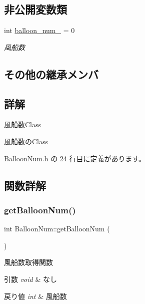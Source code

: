\subsection*{非公開変数類}
\begin{DoxyCompactItemize}
\item 
int \mbox{\hyperlink{class_balloon_num_a434ddee36deb6d0a364b890efc36c619}{balloon\+\_\+num\+\_\+}} = 0
\begin{DoxyCompactList}\small\item\em 風船数 \end{DoxyCompactList}\end{DoxyCompactItemize}
\subsection*{その他の継承メンバ}


\subsection{詳解}
風船数\+Class 

風船数の\+Class 

 Balloon\+Num.\+h の 24 行目に定義があります。



\subsection{関数詳解}
\mbox{\label{class_balloon_num_a37591e3bef6923422dc749ae380bb1e6}} 
\subsubsection{\texorpdfstring{get\+Balloon\+Num()}{getBalloonNum()}}
{\footnotesize\ttfamily int Balloon\+Num\+::get\+Balloon\+Num (\begin{DoxyParamCaption}{ }\end{DoxyParamCaption})}



風船数取得関数 


\begin{DoxyParams}{引数}
{\em void} & なし \\
\hline
\end{DoxyParams}

\begin{DoxyRetVals}{戻り値}
{\em int} & 風船数 \\
\hline
\end{DoxyRetVals}


